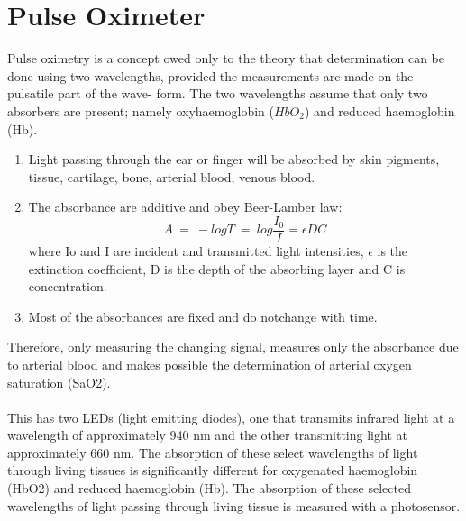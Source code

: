 \documentclass{article}
\begin{document}
\section{Pulse Oximeter}
Pulse oximetry is a concept owed only to the theory that determination can be done using two wavelengths, provided the measurements are made on the pulsatile part of the wave- form. The two wavelengths assume that only two absorbers are present; namely oxyhaemoglobin ($HbO_2$) and reduced haemoglobin (Hb).
\begin{enumerate}
    \item Light passing through the ear or finger will be absorbed by skin pigments, tissue, cartilage, bone, arterial blood, venous blood.
    \item The absorbance are additive and obey Beer-Lamber law:
    \begin{equation}
        A\:=\: -logT\:=\: log \frac{I_0}{I} = \epsilon D C
    \end{equation}
    where Io and I are incident and transmitted light intensities, $\epsilon$ is the extinction coefficient, D is the depth of the absorbing layer and C is concentration.
    \item Most of the absorbances are fixed and do notchange with time.
\end{enumerate}
Therefore, only measuring the changing signal, measures only the absorbance due to arterial blood and makes possible the determination of arterial oxygen saturation (SaO2). \\
\\
This has two LEDs (light emitting diodes), one that transmits infrared light at a wavelength of approximately 940 nm and the other transmitting light at approximately 660 nm. The absorption of these select wavelengths of light through living tissues is significantly different for oxygenated haemoglobin (HbO2) and reduced haemoglobin (Hb). The absorption of these selected wavelengths of light passing through living tissue is measured with a photosensor.
\end{document}
